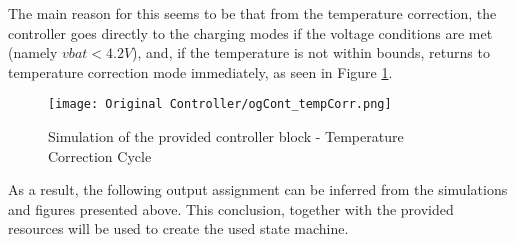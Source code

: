 \documentclass[12pt]{article}
\begin{document}
The main reason for this seems to be that from the temperature correction, the controller goes directly to the charging modes if the voltage conditions are met (namely $vbat<4.2V$), and, if the temperature is not within bounds, returns to temperature correction mode immediately, as seen in Figure \ref{fig:orig_ctr_tempCorr}.

\begin{figure}[H]
    \centering 
    \texttt{[image: Original Controller/ogCont\_tempCorr.png]}
    \caption{Simulation of the provided controller block - Temperature Correction Cycle}
    \label{fig:orig_ctr_tempCorr}
\end{figure}

As a result, the following output assignment can be inferred from the simulations and figures presented above. This conclusion, together with the provided resources will be used to create the used state machine.
\end{document}
